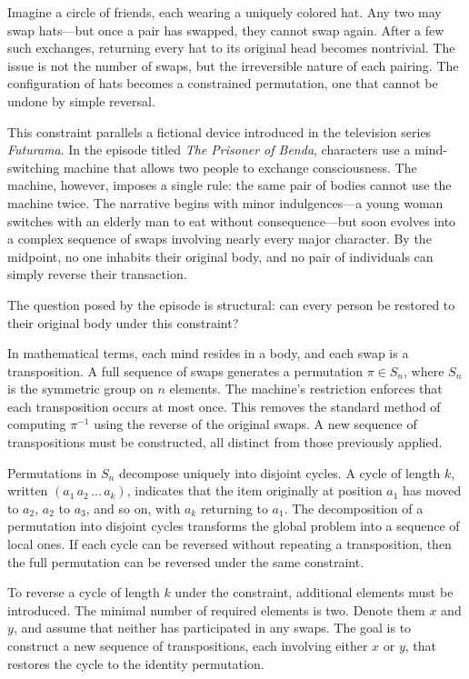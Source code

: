 Imagine a circle of friends, each wearing a uniquely colored hat. Any two may swap hats—but once a pair has swapped, they cannot swap again. After a few such exchanges, returning every hat to its original head becomes nontrivial. The issue is not the number of swaps, but the irreversible nature of each pairing. The configuration of hats becomes a constrained permutation, one that cannot be undone by simple reversal.

This constraint parallels a fictional device introduced in the television series \textit{Futurama}. In the episode titled \textit{The Prisoner of Benda}, characters use a mind-switching machine that allows two people to exchange consciousness. The machine, however, imposes a single rule: the same pair of bodies cannot use the machine twice. The narrative begins with minor indulgences—a young woman switches with an elderly man to eat without consequence—but soon evolves into a complex sequence of swaps involving nearly every major character. By the midpoint, no one inhabits their original body, and no pair of individuals can simply reverse their transaction.

The question posed by the episode is structural: can every person be restored to their original body under this constraint?

In mathematical terms, each mind resides in a body, and each swap is a transposition. A full sequence of swaps generates a permutation \( \pi \in S_n \), where \( S_n \) is the symmetric group on \( n \) elements. The machine’s restriction enforces that each transposition occurs at most once. This removes the standard method of computing \( \pi^{-1} \) using the reverse of the original swaps. A new sequence of transpositions must be constructed, all distinct from those previously applied.

Permutations in \( S_n \) decompose uniquely into disjoint cycles. A cycle of length \( k \), written \( (a_1\, a_2\, \dots\, a_k) \), indicates that the item originally at position \( a_1 \) has moved to \( a_2 \), \( a_2 \) to \( a_3 \), and so on, with \( a_k \) returning to \( a_1 \). The decomposition of a permutation into disjoint cycles transforms the global problem into a sequence of local ones. If each cycle can be reversed without repeating a transposition, then the full permutation can be reversed under the same constraint.

To reverse a cycle of length \( k \) under the constraint, additional elements must be introduced. The minimal number of required elements is two. Denote them \( x \) and \( y \), and assume that neither has participated in any swaps. The goal is to construct a new sequence of transpositions, each involving either \( x \) or \( y \), that restores the cycle to the identity permutation.

